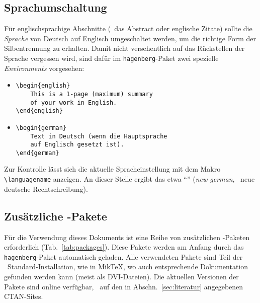 \subsection{Sprachumschaltung}
\label{sec:sprachumschaltung}

Für englischsprachige Abschnitte (\zB\ das Abstract oder englische
Zitate) sollte die \emph{Sprache} von Deutsch auf Englisch
umgeschaltet werden, um die richtige Form der Silbentrennung zu
erhalten. Damit nicht versehentlich auf das Rückstellen der
Sprache vergessen wird, sind dafür im \texttt{hagenberg}-Paket zwei
spezielle \emph{Environments} vorgesehen:
%
\begin{itemize}
\item[] 
\verb!\begin{english}!\\
\verb!    This is a 1-page (maximum) summary!\\
\verb!    of your work in English.!\\
\verb!\end{english}!
\end{itemize}

\begin{itemize}
\item[] 
\verb!\begin{german}!\\
\verb!    Text in Deutsch (wenn die Hauptsprache!\\
\verb!    auf Englisch gesetzt ist).!\\
\verb!\end{german}!
\end{itemize}
%
Zur Kontrolle lässt sich die aktuelle Spracheinstellung mit dem Makro \verb!\languagename!
anzeigen. An dieser Stelle ergibt das etwa "`\texttt{\languagename}"' (\emph{new german}, \dah\ neue deutsche Rechtschreibung).


\subsection{Zusätzliche {\latex}-Pakete}

Für die Verwendung dieses Dokuments ist eine Reihe von
zusätzlichen \latex-Paketen erforderlich
(Tab.~\ref{tab:packages}). Diese Pakete werden am Anfang
durch das \texttt{hagenberg}-Paket automatisch geladen. 
Alle verwendeten Pakete sind
Teil der \latex\ Standard-Installation, wie \zB in MikTeX, wo
auch entsprechende Dokumentation gefunden werden kann (meist als DVI-Dateien).
Die aktuellen Versionen der Pakete sind online verfügbar, \ua\ auf den
in Abschn.~\ref{sec:literatur} angegebenen CTAN-Sites.

